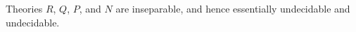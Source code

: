 Theories $R$, $Q$, $P$, and $N$ are inseparable, and hence essentially undecidable and undecidable.
